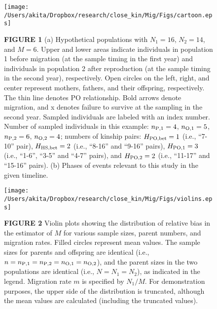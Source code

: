 \documentclass[12pt, English]{article}
\begin{document}
\begin{spacing}{1.9}
\clearpage


\newcommand{\figcapa}{(a) Hypothetical populations with $N_{1}=16$, $N_{2}=14$, and $M=6$. Upper and lower areas indicate individuals in population 1 before migration (at the sample timing in the first year) and individuals in population 2 after reproduction (at the sample timing in the second year), respectively. Open circles on the left, right, and center represent mothers, fathers, and their offspring, respectively. The thin line denotes PO relationship. Bold arrows denote migration, and x denotes failure to survive at the sampling in the second year. Sampled individuals are labeled with an index number. Number of sampled individuals in this example: $n_{\rm P, 1}=4$, $n_{\rm O, 1}=5$, $n_{\rm P, 2}=6$, $n_{\rm O, 2}=4$; numbers of kinship pairs: $H_{\rm PO, bet}=1$ (i.e., ``7-10'' pair), $H_{\rm HS, bet}=2$ (i.e., ``8-16'' and ``9-16'' pairs), $H_{\rm PO, 1}=3$ (i.e., ``1-6'', ``3-5'' and ``4-7'' pairs), and $H_{\rm PO, 2}=2$ (i.e., ``11-17'' and ``15-16'' pairs). (b) Phases of events relevant to this study in the given timeline.}

\newcommand{\figcapb}{Violin plots showing the distribution of relative bias in the estimator of $M$ for various sample sizes, parent numbers, and migration rates. Filled circles represent mean values. The sample sizes for parents and offspring are identical (i.e., $n=n_{\rm P,1}=n_{\rm P,2}=n_{\rm O,1}= n_{\rm O,2}$), and the parent sizes in the two populations are identical (i.e., $N=N_1=N_2$), as indicated in the legend. Migration rate $m$ is specified by $N_1/M$. For demonstration purposes, the upper side of the distribution is truncated, although the mean values are calculated (including the truncated values). }

\begin{figure}[!h]
	\begin{center}
		\texttt{[image: /Users/akita/Dropbox/research/close\_kin/Mig/Figs/cartoon.eps]}
		\caption{{\bf FIGURE 1} \figcapa{}}
		\label{cartoon}
	\end{center}
\end{figure}

\begin{figure}[!h]
	\begin{center}
		\texttt{[image: /Users/akita/Dropbox/research/close\_kin/Mig/Figs/violins.eps]}
		\caption{{\bf FIGURE 2} \figcapb{}}
		\label{violins}
	\end{center}
\end{figure}




\end{spacing}
\end{document}
